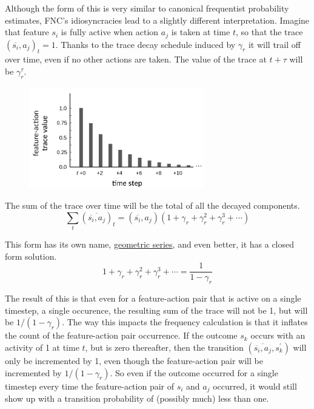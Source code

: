 Although the form of this is very similar to canonical frequentist
probability estimates, FNC's idiosyncracies lead to a slightly different
interpretation. Imagine that feature $s_i$ is fully active when action $a_j$
is taken at time $t$, so that the trace $(\overline{s_i}, a_j)_t = 1$.
Thanks to the trace decay schedule induced by $\gamma_r$ it will
trail off over time, even if no other actions are taken.
The value of the trace at $t + \tau$ will be $\gamma_r^{\tau}$. 

\begin{figure}[ht]
\vskip 0.2in
\begin{center}
\centerline{\includegraphics[width=3.0in]{images/trace_decay.png}}
\label{fig:trace}
\end{center}
\vskip -0.2in
\end{figure}

The sum of the trace over time will be the total of all the decayed components.
\begin{equation}
\sum_t (\overline{\overline{s_i}, a_j})_t = (\overline{s_i}, a_j)
\left (1 + \gamma_r + \gamma_r^2 + \gamma_r^3 + \cdots \right )
\end{equation}

This form has its own name,
\href{https://en.wikipedia.org/wiki/Geometric_series#Formula}{geometric series},
and even better, it has a closed form solution.
\begin{equation}
1 + \gamma_r + \gamma_r^2 + \gamma_r^3 + \cdots = \frac{1}{1 - \gamma_r}
\end{equation}

The result of this is that even for a feature-action pair that is active
on a single timestep, a single occurence, the resulting sum of the trace will not
be 1, but will be $1 / (1 - \gamma_r)$. The way this impacts the frequency
calculation is that it inflates the count of the feature-action pair occurrence.
If the outcome $s_k$ occurs with an activity of 1 at time $t$, but is zero
thereafter, then the transition
$(\overline{\overline{s_i}, a_j}, s^\prime_k)$ will only be incremented by 1,
even though the feature-action pair will be incremented by
$1 / (1 - \gamma_r)$. So even if the outcome occurred for a single timestep
every time the feature-action pair of $s_i$ and $a_j$ occurred, it would
still show up with a transition probability of (possibly much) less than one.

